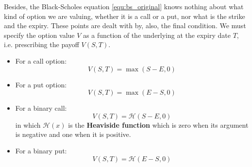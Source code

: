 Besides, the Black-Scholes equation \ref{equ:bs_original} knows nothing about what kind of option we are valuing, whether it is a call or a put, nor what is the strike and the expiry. These points are dealt with by, also, the final condition. We must specify the option value $V$ as a function of the underlying at the expiry date $T$, i.e. prescribing the payoff $V(S,T)$.
\begin{itemize}
    \setlength\itemsep{0em}
    \item For a call option:
    \begin{equation}
        V(S,T) = \max(S - E, 0)
    \end{equation}
    \item For a put option:
    \begin{equation}
        V(S,T) = \max(E - S, 0)
    \end{equation}
    \item For a binary call:
    \begin{equation}
        V(S,T) = \mathcal{H}(S - E, 0)
    \end{equation}
    in which $\mathcal{H}(x)$ is the \textbf{Heaviside function} which is zero when its argument is negative and one when it is positive.
    \item For a binary put:
    \begin{equation}
        V(S,T) = \mathcal{H}(E - S, 0)
    \end{equation}
\end{itemize}



